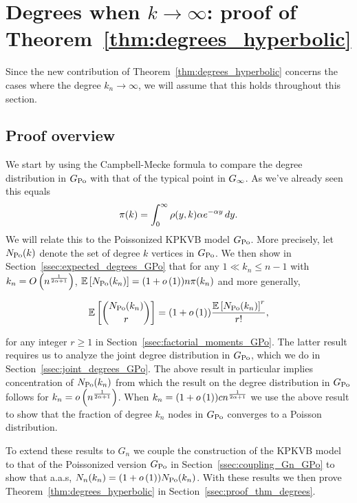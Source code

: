
\section{Degrees when \texorpdfstring{$k\to\infty$}{k tends to infinity}: proof of Theorem~\ref{thm:degrees_hyperbolic}\label{sec:degrees}}

Since the new contribution of Theorem~\ref{thm:degrees_hyperbolic} concerns the cases where the degree $k_n \to \infty$, we 
will assume that this holds throughout this section.

\subsection{Proof overview}

We start by using the Campbell-Mecke formula to compare the degree distribution in $G_{{\mathrm{Po}}}$ with that of the typical point in $G_{\infty}$. 
As we've already seen this equals 
\[
	{\pi}(k) = \int_0^\infty \rho(y,k) \alpha e^{-\alpha y} \, dy.
\]
We will relate this to the Poissonized KPKVB model $G_{{\mathrm{Po}}}$. 
More precisely, let $N_{{\mathrm{Po}}}(k)$ denote the set of degree $k$ vertices in $G_{{\mathrm{Po}}}$. 
We then show in Section~\ref{ssec:expected_degrees_GPo} that for any $1 \ll k_n \le n -1$ with 
$k_n = O\left(n^{\frac{1}{2\alpha + 1}}\right)$, $\mathbb{E}\left[N_{{\mathrm{Po}}}(k_n)\right] = (1+o\left(1\right)) n {\pi}(k_n)$ and more generally,

\begin{equation}\label{eq:def_factorial_moments_GPo}
	\mathbb{E}\left[\binom{N_{{\mathrm{Po}}}(k_n)}{r}\right] = (1+o\left(1\right)) \frac{\mathbb{E}\left[N_{{\mathrm{Po}}}(k_n)\right]^r}{r!},
\end{equation}

\noindent
for any integer $r \ge 1$ in Section~\ref{ssec:factorial_moments_GPo}. 
The latter result requires us to analyze the joint degree distribution in $G_{{\mathrm{Po}}}$, which we do in Section~\ref{ssec:joint_degrees_GPo}. 
The above result in particular implies concentration of $N_{{\mathrm{Po}}}(k_n)$ from which the result on the degree distribution in $G_{{\mathrm{Po}}}$ follows for $k_n = o\left(n^{\frac{1}{2\alpha + 1}}\right)$. When $k_n = (1+o\left(1\right)) c n^{\frac{1}{2\alpha + 1}}$ we use the above result to show that the fraction of degree $k_n$ nodes in $G_{{\mathrm{Po}}}$ converges to a Poisson distribution. 

To extend these results to $G_n$ we couple the construction of the KPKVB model to that of the Poissonized version $G_{{\mathrm{Po}}}$ in Section~\ref{ssec:coupling_Gn_GPo} to show that a.a.s, $N_n(k_n) = (1+o\left(1\right)) N_{{\mathrm{Po}}}(k_n)$. With these results we then prove Theorem~\ref{thm:degrees_hyperbolic} in Section~\ref{ssec:proof_thm_degrees}.

